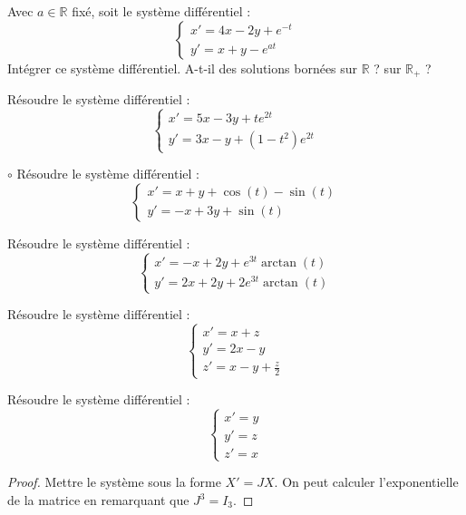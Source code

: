 \documentclass[french,a4paper]{article}
\newcommand{\R}{\mathbb{R}}
\theoremstyle{plain}
\theoremstyle{definition}
\theoremstyle{remark}
\begin{document}
\begin{ex}[Moulin.ED.21]{}
	Avec $a\in\R$ fixé, soit le système différentiel : $$\begin{cases}
		x'=4x-2y+e^{-t}\\
		y'=x+y-e^{at}
	\end{cases}$$ Intégrer ce système différentiel. A-t-il des solutions bornées sur $\R$ ? sur $\R_+$ ?
\end{ex}

\begin{ex}[Moulin.ED.22]{}
	Résoudre le système différentiel :
	$$\begin{cases}
		x'=5x-3y+te^{2t}\\
		y'=3x-y+(1-t^2)e^{2t}
	\end{cases}$$
\end{ex}

\begin{ex}[Moulin.ED.23]{$\circ$}
	Résoudre le système différentiel :
	$$\begin{cases}
		x'=x+y+\cos(t)-\sin(t)\\
		y'=-x+3y+\sin(t)
	\end{cases}$$
\end{ex}

\begin{ex}[Moulin.ED.24]{}
	Résoudre le système différentiel :
	$$\begin{cases}
		x'=-x+2y+e^{3t}\arctan(t)\\
		y'=2x+2y+2e^{3t}\arctan(t)
	\end{cases}$$
\end{ex}

\begin{ex}[Moulin.ED.25]{}
	Résoudre le système différentiel :
	$$\begin{cases}
		x'=x+z\\
		y'=2x-y\\
		z'=x-y+\displaystyle\frac{z}{2}
	\end{cases}$$
\end{ex}

\begin{ex}[Moulin.ED.26]{}
	Résoudre le système différentiel :
	$$\begin{cases}
		x'=y\\
		y'=z\\
		z'=x
	\end{cases}$$
\end{ex}
\begin{proof}
	Mettre le système sous la forme $X'=JX$. On peut calculer l'exponentielle de la matrice en remarquant que $J^3=I_3$.
\end{proof}
\end{document}
